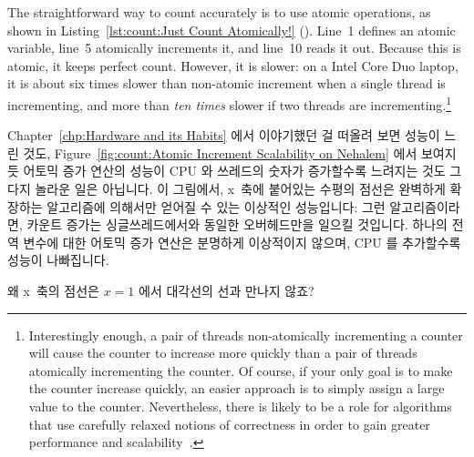 The straightforward way to count accurately is to use atomic operations,
as shown in
Listing~\ref{lst:count:Just Count Atomically!} ().
Line~1 defines an atomic variable, line~5 atomically increments it, and
line~10 reads it out.
Because this is atomic, it keeps perfect count.
However, it is slower: on a Intel Core Duo laptop, it is about
six times slower than non-atomic increment
when a single thread is incrementing, and more than \emph{ten times}
slower if two threads are incrementing.\footnote{
	Interestingly enough, a pair of threads non-atomically incrementing
	a counter will cause the counter to increase more quickly than
	a pair of threads atomically incrementing the counter.
	Of course, if your only goal is to make the counter increase
	quickly, an easier approach is to simply assign a large value
	to the counter.
	Nevertheless, there is likely to be a role for algorithms that
	use carefully relaxed notions of correctness in order to gain
	greater performance and
	scalability~\cite{Andrews91textbook,Arcangeli03,DavidUngar2011unsync}.}
\fi

Chapter~\ref{chp:Hardware and its Habits} 에서 이야기했던 걸 떠올려 보면
성능이 느린 것도,
Figure~\ref{fig:count:Atomic Increment Scalability on Nehalem} 에서 보여지듯
어토믹 증가 연산의 성능이 CPU 와 쓰레드의 숫자가 증가할수록 느려지는 것도
그다지 놀라운 일은 아닙니다.
이 그림에서, x~축에 붙어있는 수평의 점선은 완벽하게 확장하는 알고리즘에
의해서만 얻어질 수 있는 이상적인 성능입니다: 그런 알고리즘이라면, 카운트 증가는
싱글쓰레드에서와 동일한 오버헤드만을 일으킬 것입니다.
하나의 전역 변수에 대한 어토믹 증가 연산은 분명하게 이상적이지 않으며, CPU 를
추가할수록 성능이 나빠집니다.

\QuickQuiz{}
	왜 x~축의 점선은 $x=1$ 에서 대각선의 선과 만나지 않죠?
	\iffalse


